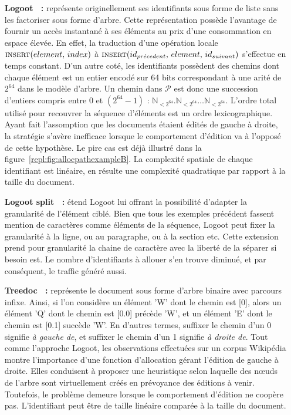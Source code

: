 \begin{itemize}
\item [\textbf{Logoot~\cite{weiss2009logoot, weiss2010collaborative,
      weiss2010logootundo} :}] représente originellement ses identifiants sous
  forme de liste sans les factoriser sous forme d'arbre. Cette représentation
  possède l'avantage de fournir un accès instantané à ses éléments au prix d'une
  consommation en espace élevée. En effet, la traduction d'une opération locale
  $\textsc{insert}(element,\, index)$ à
  $\textsc{insert}(id_{pr\acute{e}cedent},\, element,\, id_{suivant})$
  s'effectue en temps constant. D'un autre coté, les identifiants possèdent des
  chemins dont chaque élément est un entier encodé sur 64 bits correspondant à
  une arité de $2^{64}$ dans le modèle d'arbre. Un chemin dans $\mathcal{P}$ est
  donc une succession d'entiers compris entre 0 et $(2^{64}-1)$ :
  $\mathbb{N}_{<2^{64}}.\mathbb{N}_{<2^{64}}\ldots\mathbb{N}_{<2^{64}}$.
  L'ordre total utilisé pour recouvrer la séquence d'éléments est un ordre
  lexicographique. Ayant fait l'assomption que les documents étaient édités de
  gauche à droite, la stratégie s'avère inefficace lorsque le comportement
  d'édition va à l'opposé de cette hypothèse. Le pire cas est déjà illustré dans
  la figure~\ref{repl:fig:allocpathexampleB}. La complexité spatiale de chaque
  identifiant est linéaire, en résulte une complexité quadratique par rapport à
  la taille du document.
\item [\textbf{Logoot split~\cite{mehdi2014merging} :}] étend Logoot lui offrant
  la possibilité d'adapter la granularité de l'élément ciblé. Bien que tous les
  exemples précédent fassent mention de caractères comme éléments de la
  séquence, Logoot peut fixer la granularité à la ligne, ou au paragraphe, ou à
  la section etc. Cette extension prend pour granularité la chaine de caractère
  avec la liberté de la séparer si besoin est. Le nombre d'identifiants à
  allouer s'en trouve diminué, et par conséquent, le traffic généré aussi.
\item [\textbf{Treedoc~\cite{letia2009crdts, preguica2009commutative} :}]
  représente le document sous forme d'arbre binaire avec parcours infixe.
  Ainsi, si l'on considère un élément 'W' dont le chemin est [0], alors un
  élément 'Q' dont le chemin est [0.0] précède 'W', et un élément 'E' dont le
  chemin est [0.1] succède 'W'. En d'autres termes, suffixer le chemin d'un 0
  signifie \emph{à gauche de}, et suffixer le chemin d'un 1 signifie \emph{à
    droite de}. Tout comme l'approche Logoot, les observations effectuées sur un
  corpus Wikipédia montre l'importance d'une fonction d'allocation gérant
  l'édition de gauche à droite. Elles conduisent à proposer une heuristique
  selon laquelle des nœuds de l'arbre sont virtuellement créés en prévoyance des
  éditions à venir. Toutefois, le problème demeure lorsque le comportement
  d'édition ne coopère pas. L'identifiant peut être de taille linéaire comparée
  à la taille du document.
\end{itemize}



